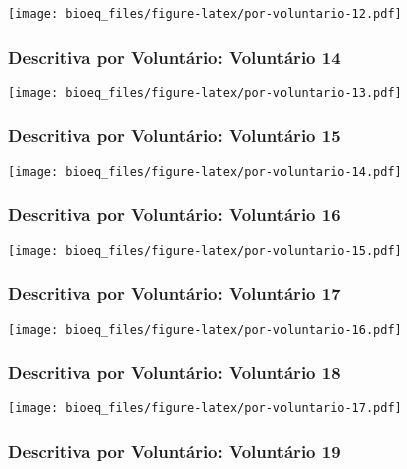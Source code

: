\documentclass[
]{article}
\begin{document}
\texttt{[image: bioeq\_files/figure-latex/por-voluntario-12.pdf]}

\hypertarget{descritiva-por-voluntuxe1rio-voluntuxe1rio-14}{%
\subsubsection{Descritiva por Voluntário: Voluntário
14}\label{descritiva-por-voluntuxe1rio-voluntuxe1rio-14}}

\texttt{[image: bioeq\_files/figure-latex/por-voluntario-13.pdf]}

\hypertarget{descritiva-por-voluntuxe1rio-voluntuxe1rio-15}{%
\subsubsection{Descritiva por Voluntário: Voluntário
15}\label{descritiva-por-voluntuxe1rio-voluntuxe1rio-15}}

\texttt{[image: bioeq\_files/figure-latex/por-voluntario-14.pdf]}

\hypertarget{descritiva-por-voluntuxe1rio-voluntuxe1rio-16}{%
\subsubsection{Descritiva por Voluntário: Voluntário
16}\label{descritiva-por-voluntuxe1rio-voluntuxe1rio-16}}

\texttt{[image: bioeq\_files/figure-latex/por-voluntario-15.pdf]}

\hypertarget{descritiva-por-voluntuxe1rio-voluntuxe1rio-17}{%
\subsubsection{Descritiva por Voluntário: Voluntário
17}\label{descritiva-por-voluntuxe1rio-voluntuxe1rio-17}}

\texttt{[image: bioeq\_files/figure-latex/por-voluntario-16.pdf]}

\hypertarget{descritiva-por-voluntuxe1rio-voluntuxe1rio-18}{%
\subsubsection{Descritiva por Voluntário: Voluntário
18}\label{descritiva-por-voluntuxe1rio-voluntuxe1rio-18}}

\texttt{[image: bioeq\_files/figure-latex/por-voluntario-17.pdf]}

\hypertarget{descritiva-por-voluntuxe1rio-voluntuxe1rio-19}{%
\subsubsection{Descritiva por Voluntário: Voluntário
19}\label{descritiva-por-voluntuxe1rio-voluntuxe1rio-19}}
\end{document}
